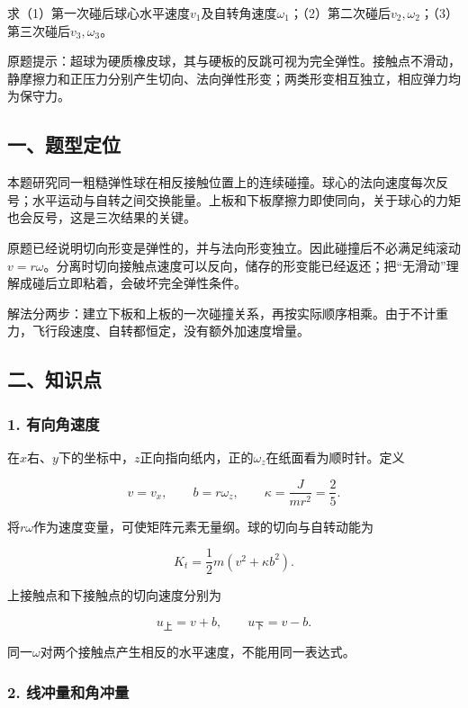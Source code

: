 \documentclass[12pt,a4paper,fontset=fandol]{ctexart}
\begin{document}
求（1）第一次碰后球心水平速度\(v_1\)及自转角速度\(\omega_1\)；（2）第二次碰后\(v_2,\omega_2\)；（3）第三次碰后\(v_3,\omega_3\)。

原题提示：超球为硬质橡皮球，其与硬板的反跳可视为完全弹性。接触点不滑动，静摩擦力和正压力分别产生切向、法向弹性形变；两类形变相互独立，相应弹力均为保守力。

\subsection{一、题型定位}\label{ux4e00ux9898ux578bux5b9aux4f4d-2}

本题研究同一粗糙弹性球在相反接触位置上的连续碰撞。球心的法向速度每次反号；水平运动与自转之间交换能量。上板和下板摩擦力即使同向，关于球心的力矩也会反号，这是三次结果的关键。

原题已经说明切向形变是弹性的，并与法向形变独立。因此碰撞后不必满足纯滚动\(v=r\omega\)。分离时切向接触点速度可以反向，储存的形变能已经返还；把``无滑动''理解成碰后立即粘着，会破坏完全弹性条件。

解法分两步：建立下板和上板的一次碰撞关系，再按实际顺序相乘。由于不计重力，飞行段速度、自转都恒定，没有额外加速度增量。

\subsection{二、知识点}\label{ux4e8cux77e5ux8bc6ux70b9-2}

\subsubsection{1. 有向角速度}\label{ux6709ux5411ux89d2ux901fux5ea6}

在\(x\)右、\(y\)下的坐标中，\(z\)正向指向纸内，正的\(\omega_z\)在纸面看为顺时针。定义

\[
v=v_x,\qquad b=r\omega_z,\qquad \kappa=\frac{J}{mr^2}=\frac25.
\]

将\(r\omega\)作为速度变量，可使矩阵元素无量纲。球的切向与自转动能为

\[
K_t=\frac12m(v^2+\kappa b^2).
\]

上接触点和下接触点的切向速度分别为

\[
u_{\text{上}}=v+b,\qquad u_{\text{下}}=v-b.
\]

同一\(\omega\)对两个接触点产生相反的水平速度，不能用同一表达式。

\subsubsection{2.
线冲量和角冲量}\label{ux7ebfux51b2ux91cfux548cux89d2ux51b2ux91cf}
\end{document}

